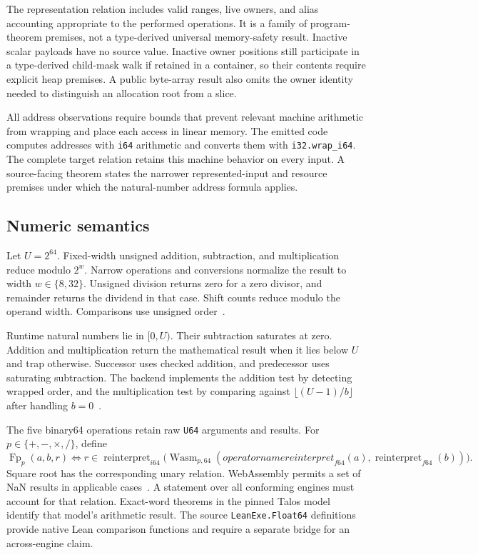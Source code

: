 \documentclass[11pt]{article}
\newcommand{\code}[1]{\texttt{#1}}
\begin{document}
The representation relation includes valid ranges, live owners, and alias accounting appropriate to the performed operations.  It is a family of program-theorem premises, not a type-derived universal memory-safety result.  Inactive scalar payloads have no source value.  Inactive owner positions still participate in a type-derived child-mask walk if retained in a container, so their contents require explicit heap premises.  A public byte-array result also omits the owner identity needed to distinguish an allocation root from a slice.

All address observations require bounds that prevent relevant machine arithmetic from wrapping and place each access in linear memory.  The emitted code computes addresses with \code{i64} arithmetic and converts them with \code{i32.wrap\_i64}.  The complete target relation retains this machine behavior on every input.  A source-facing theorem states the narrower represented-input and resource premises under which the natural-number address formula applies.

\subsection{Numeric semantics}

Let $U=2^{64}$.  Fixed-width unsigned addition, subtraction, and multiplication reduce modulo $2^w$.  Narrow operations and conversions normalize the result to width $w\in\{8,32\}$.  Unsigned division returns zero for a zero divisor, and remainder returns the dividend in that case.  Shift counts reduce modulo the operand width.  Comparisons use unsigned order~\cite{extract,binary}.

Runtime natural numbers lie in $[0,U)$.  Their subtraction saturates at zero.  Addition and multiplication return the mathematical result when it lies below $U$ and trap otherwise.  Successor uses checked addition, and predecessor uses saturating subtraction.  The backend implements the addition test by detecting wrapped order, and the multiplication test by comparing against $\lfloor(U-1)/b\rfloor$ after handling $b=0$~\cite{binary}.

The five binary64 operations retain raw \code{U64} arguments and results.  For $p\in\{+,-,\times,/\}$, define
\[
\operatorname{Fp}_p(a,b,r)
\iff
r\in\operatorname{reinterpret}_{i64}
 \bigl(\operatorname{Wasm}_{p,64}(operatorname{reinterpret}_{f64}(a),
                                \operatorname{reinterpret}_{f64}(b))\bigr).
\]
Square root has the corresponding unary relation.  WebAssembly permits a set of NaN results in applicable cases~\cite{wasm}.  A statement over all conforming engines must account for that relation.  Exact-word theorems in the pinned Talos model identify that model's arithmetic result.  The source \code{LeanExe.Float64} definitions provide native Lean comparison functions and require a separate bridge for an across-engine claim.
\end{document}
